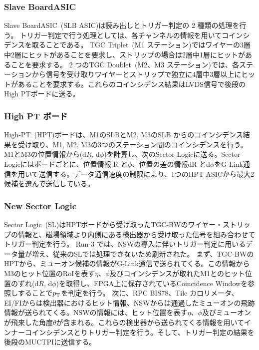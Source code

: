 \subsubsection{Slave BoardASIC}
Slave BoardASIC~(SLB ASIC)は読み出しとトリガー判定の 2 種類の処理を行う。
トリガー判定で行う処理としては、各チャンネルの情報を用いてコインシデンスを取ることである。
TGC Triplet~(M1 ステーション)ではワイヤーの3層中2層にヒットがあることを要求し、ストリップの場合は2層中1層にヒットがあることを要求する。
2 つのTGC Doublet~(M2、M3 ステーション)では、各ステーションから信号を受け取りワイヤーとストリップで独立に4層中3層以上にヒットがあることを要求する。これらのコインシデンス結果はLVDS信号で後段のHigh PTボードに送る。

\subsubsection{High PT ボード}
High-PT~(HPT)ボードは、M1のSLBとM2, M3のSLB からのコインシデンス結果を受け取り、M1, M2, M3の3つのステーション間のコインシデンスを行う。M1とM3の位置情報から(d$R$, d$\phi$)を計算し、次のSector Logicに送る。Sector Logicにはボードごとに、位置情報 R と$\phi$、位置の差の情報dR とd$\phi$をG-Link通信を用いて送信する。データ通信速度の制限により、1つのHPT-ASICから最大2候補を選んで送信している。

\subsubsection{New Sector Logic}
Sector Logic~(SL)はHPTボードから受け取ったTGC-BWのワイヤー・ストリップの情報と、磁場領域より内側にある検出器から受け取った信号を組み合わせてトリガー判定を行う。
Run-3 では、NSWの導入に伴いトリガー判定に用いるデータ量が増え、従来のSLでは処理できないため刷新された。
まず、TGC-BWのHPTから、ミューオン候補の情報がG-Link通信で送られてくる。この情報からM3のヒット位置のRoIを表す$\eta$、$\phi$及びコインシデンスが取れたM1とのヒット位置のずれ(d$R$, d$\phi$)を取得し、FPGA上に保存されているCoincidence Windowを参照しすることで$p_{\rm{T}}$を判定を行う。
次に、RPC BIS78、Tile カロリメータ、EI/FIからは検出器におけるヒット情報、NSWからは通過したミューオンの飛跡情報が送られてくる。NSWの情報には、ヒット位置を表す$\eta$、$\phi$及びミューオンが飛来した角度$\theta$が含まれる。これらの検出器から送られてくる情報を用いてインナーコインシデンスとりトリガー判定を行う。そして、トリガー判定の結果を後段のMUCTPIに送信する。

